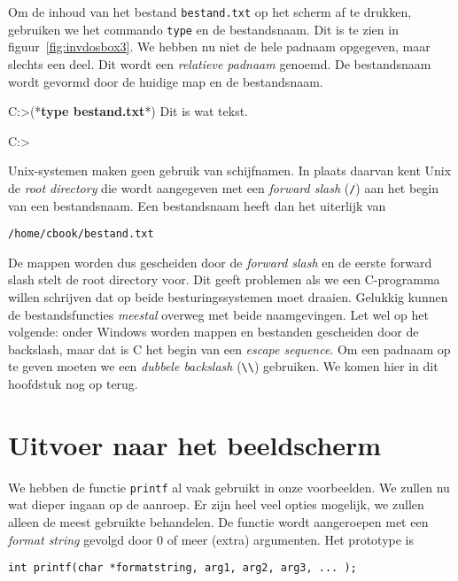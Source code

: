 Om de inhoud van het bestand \texttt{bestand.txt} op het scherm af te drukken, gebruiken we het commando \texttt{type} en de bestandsnaam. Dit is te zien in figuur~\ref{fig:invdosbox3}. We hebben nu niet de hele padnaam opgegeven, maar slechts een deel. Dit wordt een \textsl{relatieve padnaam} genoemd. De bestandsnaam wordt gevormd door de huidige map en de bestandsnaam.

\begin{dosbox}[title=Afdrukken van een bestand.,label=fig:invdosbox3]
C:\Users\Cbook>(*\textbf{type bestand.txt}*)
Dit is wat tekst.

C:\Users\Cbook>
\end{dosbox}


Unix-systemen maken geen gebruik van schijfnamen. In plaats daarvan kent Unix de \textsl{root directory} die wordt aangegeven met een \textsl{forward slash} (\texttt{/}) aan het begin van een bestandsnaam. Een bestandsnaam heeft dan het uiterlijk van

\hspace*{1em}\texttt{/home/cbook/bestand.txt}

De mappen worden dus gescheiden door de \textsl{forward slash} en de eerste forward slash stelt de root directory voor. Dit geeft problemen als we een C-programma willen schrijven dat op beide besturingssystemen moet draaien. Gelukkig kunnen de bestandsfuncties \textsl{meestal} overweg met beide naamgevingen. Let wel op het volgende: onder Windows worden mappen en bestanden gescheiden door de backslash, maar dat is C het begin van een \textsl{escape sequence}. Om een padnaam op te geven moeten we een \textsl{dubbele backslash} (\texttt{\textbackslash\textbackslash}) gebruiken. We komen hier in dit hoofdstuk nog op terug.

\section{Uitvoer naar het beeldscherm}
We hebben de functie \texttt{printf} al vaak gebruikt in onze voorbeelden. We zullen nu wat dieper ingaan op de aanroep. Er zijn heel veel opties mogelijk, we zullen alleen de meest gebruikte behandelen. De functie wordt aangeroepen met een \textsl{format string} gevolgd door 0 of meer (extra) argumenten. Het prototype is

\hspace*{1em}\texttt{int printf(char *formatstring, arg1, arg2, arg3, ... );}

